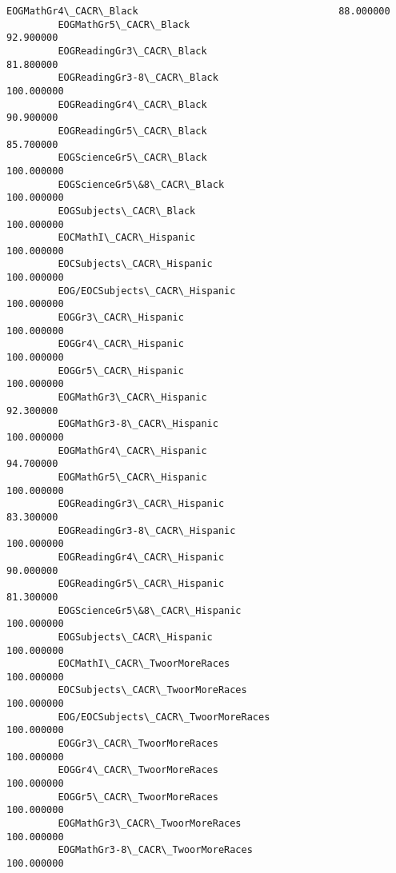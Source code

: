 \documentclass[11pt]{article}
\begin{document}
\begin{Verbatim}[commandchars=\\\{\}]
         EOGMathGr4\_CACR\_Black                                   88.000000  
         EOGMathGr5\_CACR\_Black                                   92.900000  
         EOGReadingGr3\_CACR\_Black                                81.800000  
         EOGReadingGr3-8\_CACR\_Black                             100.000000  
         EOGReadingGr4\_CACR\_Black                                90.900000  
         EOGReadingGr5\_CACR\_Black                                85.700000  
         EOGScienceGr5\_CACR\_Black                               100.000000  
         EOGScienceGr5\&8\_CACR\_Black                             100.000000  
         EOGSubjects\_CACR\_Black                                 100.000000  
         EOCMathI\_CACR\_Hispanic                                 100.000000  
         EOCSubjects\_CACR\_Hispanic                              100.000000  
         EOG/EOCSubjects\_CACR\_Hispanic                          100.000000  
         EOGGr3\_CACR\_Hispanic                                   100.000000  
         EOGGr4\_CACR\_Hispanic                                   100.000000  
         EOGGr5\_CACR\_Hispanic                                   100.000000  
         EOGMathGr3\_CACR\_Hispanic                                92.300000  
         EOGMathGr3-8\_CACR\_Hispanic                             100.000000  
         EOGMathGr4\_CACR\_Hispanic                                94.700000  
         EOGMathGr5\_CACR\_Hispanic                               100.000000  
         EOGReadingGr3\_CACR\_Hispanic                             83.300000  
         EOGReadingGr3-8\_CACR\_Hispanic                          100.000000  
         EOGReadingGr4\_CACR\_Hispanic                             90.000000  
         EOGReadingGr5\_CACR\_Hispanic                             81.300000  
         EOGScienceGr5\&8\_CACR\_Hispanic                          100.000000  
         EOGSubjects\_CACR\_Hispanic                              100.000000  
         EOCMathI\_CACR\_TwoorMoreRaces                           100.000000  
         EOCSubjects\_CACR\_TwoorMoreRaces                        100.000000  
         EOG/EOCSubjects\_CACR\_TwoorMoreRaces                    100.000000  
         EOGGr3\_CACR\_TwoorMoreRaces                             100.000000  
         EOGGr4\_CACR\_TwoorMoreRaces                             100.000000  
         EOGGr5\_CACR\_TwoorMoreRaces                             100.000000  
         EOGMathGr3\_CACR\_TwoorMoreRaces                         100.000000  
         EOGMathGr3-8\_CACR\_TwoorMoreRaces                       100.000000  

\end{Verbatim}
\end{document}
